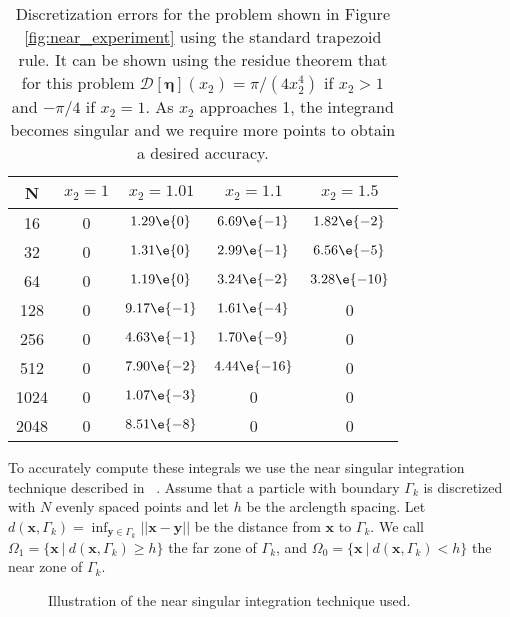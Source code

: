 \begin{table}[!h]\label{table:near_singular}
\caption[Discretization errors for regular trapezoid rule applied to near singular problem.]{Discretization errors for the problem shown in Figure \ref{fig:near_experiment} using the standard trapezoid rule. It can be shown using the residue theorem that for this problem $\mathcal{D}[\pmb{\eta}](x_2) = \pi/(4x_2^4)$ if $x_2>1$ and $-\pi/4$ if $x_2=1$.  As $x_2$ approaches 1, the integrand becomes singular and we require more points to obtain a desired accuracy.}
\begin{center}
\begin{tabular}{c|c|c|c|c}
 N& $x_2=1$ & $x_2=1.01$ & $x_2=1.1$ & $x_2=1.5$ \\
\hline
16 & 0 &  $1.29\e{0}$  & $6.69\e{-1}$ & $1.82\e{-2}$\\
32  & 0 &  $1.31\e{0}$  & $2.99\e{-1}$ &  $6.56\e{-5}$\\
64  & 0 &  $1.19\e{0}$  & $3.24\e{-2}$  & $3.28\e{-10}$ \\
128  & 0 &   $9.17\e{-1}$  & $1.61\e{-4}$  & 0 \\
256  & 0 &   $4.63\e{-1}$ & $1.70\e{-9}$ &  0 \\
512 & 0 &   $7.90\e{-2}$ &  $4.44\e{-16}$  & 0\\
1024 & 0 &   $1.07\e{-3}$ & 0 & 0\\
2048 & 0 &   $8.51\e{-8}$ & 0 &  0 
\end{tabular}
\end{center}
\end{table}


To accurately compute these integrals we use the near singular integration technique described in ~\cite{Quaife2014, Ying2006}. Assume that a particle with boundary $\Gamma_k$ is discretized with $N$ evenly spaced points and let $h$ be the arclength spacing. Let $d(\mathbf{x},\Gamma_k) = \inf_{\mathbf{y}\in\Gamma_k}||\mathbf{x}-\mathbf{y}||$ be the distance from $\mathbf{x}$ to $\Gamma_k$. We call $\Omega_1 = \{\mathbf{x}\: |\: d(\mathbf{x},\Gamma_k) \geq h\}$ the far zone of $\Gamma_k$, and $\Omega_0 = \{\mathbf{x}\:  |\: d(\mathbf{x},\Gamma_k) < h\}$ the near zone of $\Gamma_k$. 

\begin{figure}[!h]
\begin{center}

\caption{Illustration of the near singular integration technique used.}\label{fig:ns_drawing}
\end{center}
\end{figure}

